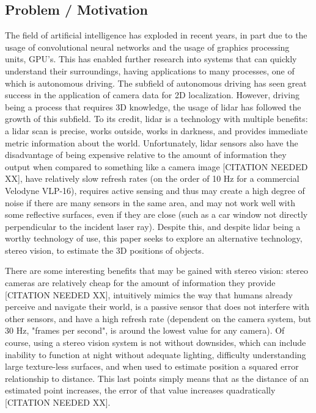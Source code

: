 \subsection{Problem / Motivation}
The field of artificial intelligence has exploded in recent years, in part due to the usage of convolutional neural networks and the usage of graphics processing units, GPU's. This has enabled further research into systems that can quickly understand their surroundings, having applications to many processes, one of which is autonomous driving. The subfield of autonomous driving has seen great success in the application of camera data for 2D localization. However, driving being a process that requires 3D knowledge, the usage of lidar has followed the growth of this subfield. To its credit, lidar is a technology with multiple benefits: a lidar scan is precise, works outside, works in darkness, and provides immediate metric information about the world. Unfortunately, lidar sensors also have the disadvantage of being expensive relative to the amount of information they output when compared to something like a camera image [CITATION NEEDED XX], have relatively slow refresh rates (on the order of 10 Hz for a commercial Velodyne VLP-16), requires active sensing and thus may create a high degree of noise if there are many sensors in the same area, and may not work well with some reflective surfaces, even if they are close (such as a car window not directly perpendicular to the incident laser ray). Despite this, and despite lidar being a worthy technology of use, this paper seeks to explore an alternative technology, stereo vision, to estimate the 3D positions of objects.

There are some interesting benefits that may be gained with stereo vision: stereo cameras are relatively cheap for the amount of information they provide [CITATION NEEDED XX], intuitively mimics the way that humans already perceive and navigate their world, is a passive sensor that does not interfere with other sensors, and have a high refresh rate (dependent on the camera system, but 30 Hz, "frames per second", is around the lowest value for any camera). Of course, using a stereo vision system is not without downsides, which can include inability to function at night without adequate lighting, difficulty understanding large texture-less surfaces, and when used to estimate position a squared error relationship to distance. This last points simply means that as the distance of an estimated point increases, the error of that value increases quadratically [CITATION NEEDED XX].

